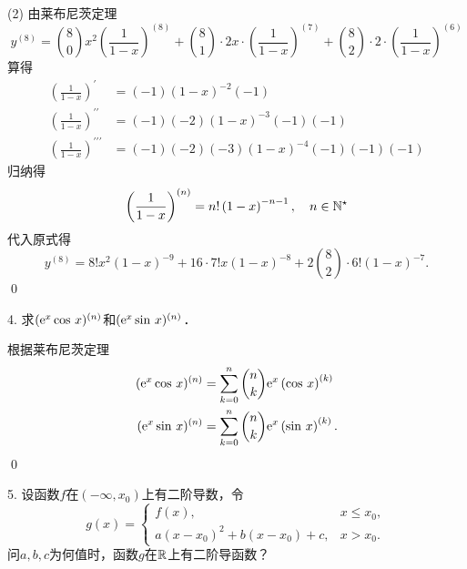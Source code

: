 (2) \solve 由莱布尼茨定理
\begin{equation}
    y^{(8)} = \binom{8}{0} x^2 \left(\frac{1}{1-x}\right)^{(8)} + \binom{8}{1} \cdot 2x \cdot \left(\frac{1}{1-x}\right)^{(7)} + \binom{8}{2} \cdot 2 \cdot \left(\frac{1}{1-x}\right)^{(6)} 
\end{equation}
算得
\begin{align}
    \left(\frac{1}{1-x}\right)^\prime &= \left(-1\right)\left(1-x\right)^{-2}(-1) \\
    \left(\frac{1}{1-x}\right)^{\prime\prime} &= (-1)(-2)\left(1-x\right)^{-3}(-1)(-1) \\
    \left(\frac{1}{1-x}\right)^{\prime\prime\prime} &= (-1)(-2)(-3)\left(1-x\right)^{-4}(-1)(-1)(-1)
\end{align}
归纳得
\begin{equation}
    \left(\frac{1}{1-x}\right)^{(n)} = n! \left(1-x\right)^{-n-1}, \quad n \in \mathbb{N}^\star
\end{equation}
代入原式得
\begin{equation}
    y^{(8)} = 8! x^2 (1-x)^{-9} + 16 \cdot 7! x \left(1-x\right)^{-8} + 2 \binom{8}{2} \cdot 6! \left(1-x\right)^{-7}.
\end{equation}
\qed\bigskip

4. 求$(\mathrm{e}^x \cos \, x)^{(n)}$和$(\mathrm{e}^x \sin \, x)^{(n)}$．

\solve 根据莱布尼茨定理
\begin{align}
    (\mathrm{e}^x \cos \, x)^{(n)} &= \sum_{k = 0}^n \binom{n}{k} \mathrm{e}^x \left(\cos \, x\right)^{(k)} \\
    (\mathrm{e}^x \sin \, x)^{(n)} &= \sum_{k = 0}^n \binom{n}{k} \mathrm{e}^x \left(\sin \, x\right)^{(k)}.
\end{align}
\qed\bigskip

5. 设函数$f$在$(-\infty, x_0)$上有二阶导数，令
\begin{equation*}
    g(x) = \begin{cases}
        f(x), & x \leq x_0, \\
        a(x-x_0)^2+b(x-x_0)+c, & x > x_0.
    \end{cases}
\end{equation*}
问$a,b,c$为何值时，函数$g$在$\mathbb{R}$上有二阶导函数？

